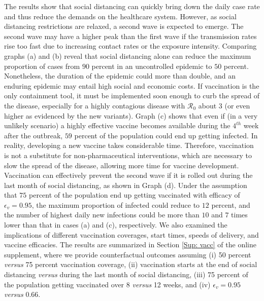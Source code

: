 \documentclass[12pt]{article}
\begin{document}
The results show that social distancing can quickly bring down the daily case
rate and thus reduce the demands on the healthcare system. However, as social
distancing restrictions are relaxed, a second wave is expected to emerge. The
second wave may have a higher peak than the first wave if the transmission
rates rise too fast due to increasing contact rates or the exposure intensity.
Comparing graphs (a) and (b) reveal that social distancing alone can reduce
the maximum proportion of cases from $90$ percent in an uncontrolled epidemic
to $50$ percent. Nonetheless, the duration of the epidemic could more than
double, and an enduring epidemic may entail high social and economic costs. If
vaccination is the only containment tool, it must be implemented soon enough
to curb the spread of the disease, especially for a highly contagious disease
with $\mathcal{R}_{0}$ about $3$ (or even higher as evidenced by the new
variants). Graph (c) shows that even if (in a very unlikely scenario) a highly
effective vaccine becomes available during the $4^{th}$ week after the
outbreak, $59$ percent of the population could end up getting infected. In
reality, developing a new vaccine takes considerable time. Therefore,
vaccination is not a substitute for non-pharmaceutical interventions, which
are necessary to slow the spread of the disease, allowing more time for
vaccine development. Vaccination can effectively prevent the second wave if it
is rolled out during the last month of social distancing, as shown in Graph
(d). Under the assumption that $75$ percent of the population end up getting
vaccinated with efficacy of $\epsilon_{v}=0.95$, the maximum proportion of
infected could reduce to $12$ percent, and the number of highest daily new
infections could be more than $10$ and $7$ times lower than that in cases (a)
and (c), respectively. We also examined the implications of different
vaccination coverages, start times, speeds of delivery, and vaccine
efficacies. The results are summarized in Section \ref{Sup: vacc} of the
online supplement, where we provide counterfactual outcomes assuming (i) 50
percent \textit{versus} 75 percent vaccination coverage, (ii) vaccination
starts at the end of social distancing \textit{versus} during the last month
of social distancing, (iii) 75 percent of the population getting vaccinated
over 8 \textit{versus} 12 weeks, and (iv) $\epsilon_{v}=0.95$ \textit{versus}
$0.66$.%
\end{document}
